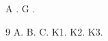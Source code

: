 \documentclass{article}
\begin{document}
A \citep{c,a,b}. G \citep{k1,k2,k3}.
\begin{thebibliography}{9}
 A.  B.  C.
 K1.  K2.  K3.
\end{thebibliography}
\end{document}
